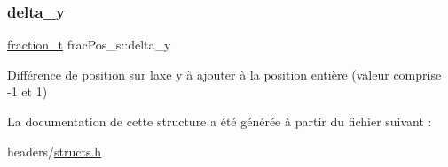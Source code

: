 \subsubsection{\texorpdfstring{delta\+\_\+y}{delta\_y}}
{\footnotesize\ttfamily \hyperlink{structfraction__s}{fraction\+\_\+t} frac\+Pos\+\_\+s\+::delta\+\_\+y}

Différence de position sur l\textquotesingle{}axe y à ajouter à la position entière (valeur comprise -\/1 et 1) 

La documentation de cette structure a été générée à partir du fichier suivant \+:\begin{DoxyCompactItemize}
\item 
headers/\hyperlink{structs_8h}{structs.\+h}\end{DoxyCompactItemize}
